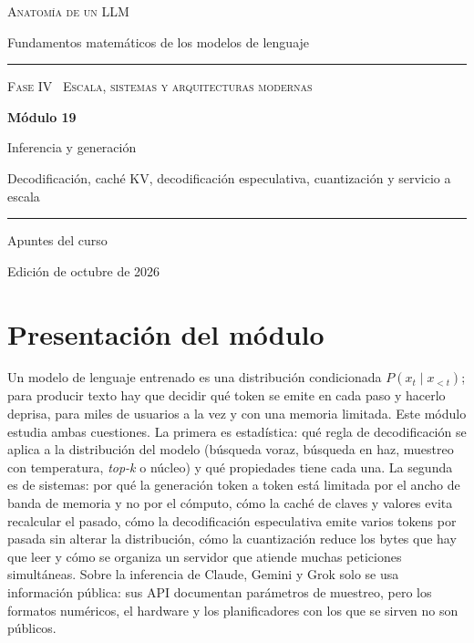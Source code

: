 \documentclass[11pt,a4paper,twoside,openany]{book}
\begin{document}
\frontmatter
\begin{titlepage}
\centering
\vspace*{2.5cm}
{\large\scshape Anatomía de un LLM}\par
\vspace{0.4cm}
{\normalsize Fundamentos matemáticos de los modelos de lenguaje}\par
\vspace{2.2cm}
\rule{\textwidth}{0.8pt}\par\vspace{0.5cm}
{\small\scshape Fase IV \textperiodcentered\ Escala, sistemas y arquitecturas modernas}\par\vspace{0.3cm}
{\Huge\bfseries Módulo 19\par}\vspace{0.3cm}
{\LARGE Inferencia y generación\par}
\vspace{0.2cm}
{\large Decodificación, caché KV, decodificación especulativa, cuantización y servicio a escala\par}
\vspace{0.5cm}\rule{\textwidth}{0.4pt}\par
\vspace{1.6cm}
{\large Apuntes del curso}\par
\vfill
{\small Edición de octubre de 2026}\par
\end{titlepage}

\chapter*{Presentación del módulo}

Un modelo de lenguaje entrenado es una distribución condicionada $P(x_t\mid x_{<t})$; para producir texto hay que decidir qué token se emite en cada paso y hacerlo deprisa, para miles de usuarios a la vez y con una memoria limitada. Este módulo estudia ambas cuestiones. La primera es estadística: qué regla de decodificación se aplica a la distribución del modelo (búsqueda voraz, búsqueda en haz, muestreo con temperatura, \emph{top-k} o núcleo) y qué propiedades tiene cada una. La segunda es de sistemas: por qué la generación token a token está limitada por el ancho de banda de memoria y no por el cómputo, cómo la caché de claves y valores evita recalcular el pasado, cómo la decodificación especulativa emite varios tokens por pasada sin alterar la distribución, cómo la cuantización reduce los bytes que hay que leer y cómo se organiza un servidor que atiende muchas peticiones simultáneas. Sobre la inferencia de Claude, Gemini y Grok solo se usa información pública: sus API documentan parámetros de muestreo, pero los formatos numéricos, el hardware y los planificadores con los que se sirven no son públicos.
\end{document}
